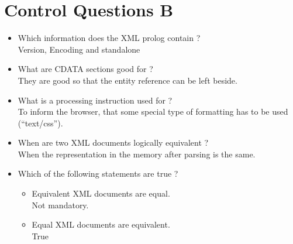 \section{Control Questions B}
\begin{itemize}
\item Which information does the XML prolog contain ?\\
Version, Encoding and standalone
\item What are CDATA sections good for ?\\
They are good so that the entity reference can be left beside.
\item What is a processing instruction used for ?\\
To inform the browser, that some special type of formatting has to be used ("`text/css"').
\item When are two XML documents logically equivalent ?\\
When the representation in the memory after parsing is the same.
\item Which of the following statements are true ?
\begin{itemize}
\item Equivalent XML documents are equal.\\
Not mandatory.
\item Equal XML documents are equivalent.\\
True
\end{itemize}
\end{itemize}